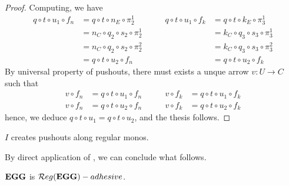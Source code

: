 \begin{proof}
	Computing, we have
	\[
		\begin{split}
			q \circ t \circ u_1 \circ f_n &= q \circ t \circ n_E \circ \pi_2^1 \\ &= n_C \circ q_2 \circ s_2 \circ \pi_2^1 \\&= n_C \circ q_2 \circ s_2 \circ \pi_2^2 \\&=q \circ t \circ u_2 \circ f_n 
			\end{split}
			\qquad
			\begin{split} q \circ t \circ u_1 \circ f_k &= q \circ t \circ k_E \circ \pi_3^1 \\ &= k_C \circ q_3 \circ s_3 \circ \pi_3^1 \\&= k_C \circ q_3 \circ s_3 \circ \pi_3^2 \\&=q \circ t \circ u_2 \circ f_k
			\end{split}
	\]
	By universal property of pushouts, there must exists a unque arrow $v: U \to C$ such that 
	\[\begin{split}v \circ f_n &= q \circ t \circ u_1 \circ f_n\\v\circ f_n  &= q \circ t \circ u_2 \circ f_n \end{split}\qquad\begin{split}v \circ f_k &= q \circ t \circ u_1 \circ f_k\\v \circ f_k &= q \circ t \circ u_2 \circ f_k\end{split}\]
		 hence, we deduce $q \circ t \circ u_1 = q \circ t \circ u_2$, and the thesis follows.
\end{proof}


\begin{cor}
	$I$ creates pushouts along regular monos.
\end{cor}

By direct application of , we can conclude what follows.

\begin{cor}
	$\mathbf{EGG}$ is $\mathcal{R}eg(\mathbf{EGG})-adhesive$.
\end{cor}



